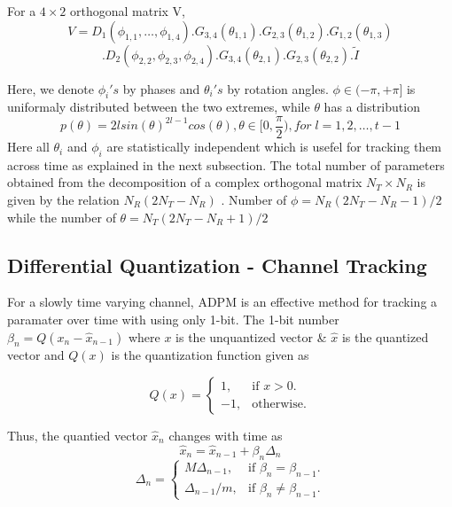 \documentclass[conference]{IEEEtran}
\begin{document}
For a $4 \times 2$ orthogonal matrix V, 
$$V = D_{1}(\phi_{1,1},\ldots,\phi_{1,4}).G_{3,4}(\theta_{1,1}) .G_{2,3}(\theta_{1,2}) .G_{1,2}(\theta_{1,3})$$
\vspace{-1.4em}
\hspace{1pt}$$.D_{2}(\phi_{2,2},\phi_{2,3},\phi_{2,4}) .G_{3,4}(\theta_{2,1}) .G_{2,3}(\theta_{2,2}).\tilde{I}$$

Here, we denote $\phi_{i}'s$ by phases and $\theta_{i}'s$ by rotation angles. $\phi \in (-\pi, + \pi]$ is uniformaly distributed between the two extremes\cite{4114278}, while $\theta$ has a distribution
\begin{equation}
p(\theta) = 2lsin(\theta)^{2l-1}cos(\theta), \theta \in [0, \frac{\pi}{2}), for \; l = 1,2,\ldots,t-1
\end{equation} 
Here all $\theta_i$ and $\phi_i$ are statistically independent which is usefel for tracking them across time as explained in the next subsection. The total number of parameters obtained from the decomposition of a complex orthogonal matrix $N_{T} \times N_{R} $ is given by the relation $N_{R}(2N_{T} - N_{R}) $ \cite{4114278}. Number of $\phi = N_{R}(2N_{T} - N_{R}-1)/2$ while the number of $\theta = N_{T}(2N_{T} - N_{R}+1)/2$

\subsection{Differential Quantization - Channel Tracking}
\label{quantiz}
For a slowly time varying channel, ADPM is an effective method for tracking a paramater over time with using only 1-bit. The 1-bit number $\beta_{n} = Q(x_{n} - \hat{x}_{n-1})$ where $x$ is the unquantized vector \& $\hat{x}$ is the quantized vector and $Q(x)$ is the quantization function given as

\begin{equation}
  Q(x)=\begin{cases}
    1, & \text{if $x>0$}.\\
    -1, & \text{otherwise}.
  \end{cases}
\end{equation}

Thus, the quantied vector $\hat{x}_n$ changes with time as 
\begin{equation}
\hat{x}_{n} = \hat{x}_{n-1} + \beta_{n}\Delta_{n}
\end{equation}
\begin{equation}
\Delta_{n} = \begin{cases}
    M \Delta_{n-1}, & \text{if $\beta_{n} = \beta_{n-1}$}.\\
    \Delta_{n-1}/m , & \text{if $\beta_{n} \neq \beta_{n-1}$}.
  \end{cases}
\end{equation}
\end{document}
